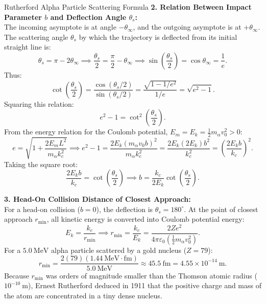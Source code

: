 \begin{workedexample}{Rutherford Alpha Particle Scattering Formula}
\textbf{2. Relation Between Impact Parameter $b$ and Deflection Angle $\theta_s$:}\\
The incoming asymptote is at angle $-\theta_\infty$, and the outgoing asymptote is at $+\theta_\infty$.
The scattering angle $\theta_s$ by which the trajectory is deflected from its initial straight line is:
\[
\theta_s = \pi - 2\theta_\infty \implies \frac{\theta_s}{2} = \frac{\pi}{2} - \theta_\infty \implies \sin\left(\frac{\theta_s}{2}\right) = \cos\theta_\infty = \frac{1}{e}.
\]
Thus:
\[
\cot\left(\frac{\theta_s}{2}\right) = \frac{\cos(\theta_s/2)}{\sin(\theta_s/2)} = \frac{\sqrt{1 - 1/e^2}}{1/e} = \sqrt{e^2 - 1}.
\]
Squaring this relation:
\[
e^2 - 1 = \cot^2\left(\frac{\theta_s}{2}\right).
\]
From the energy relation for the Coulomb potential, $E_m = E_k = \frac{1}{2}m_\alpha v_0^2 > 0$:
\[
e = \sqrt{1 + \frac{2 E_m L^2}{m_\alpha k_c^2}} \implies e^2 - 1 = \frac{2 E_k (m_\alpha v_0 b)^2}{m_\alpha k_c^2} = \frac{2 E_k (2 E_k) b^2}{k_c^2} = \left(\frac{2 E_k b}{k_c}\right)^2.
\]
Taking the square root:
\[
\frac{2 E_k b}{k_c} = \cot\left(\frac{\theta_s}{2}\right) \implies b = \frac{k_c}{2 E_k} \cot\left(\frac{\theta_s}{2}\right).
\]

\textbf{3. Head-On Collision Distance of Closest Approach:}\\
For a head-on collision ($b = 0$), the deflection is $\theta_s = 180^\circ$. At the point of closest approach $r_{\min}$, all kinetic energy is converted into Coulomb potential energy:
\[
E_k = \frac{k_c}{r_{\min}} \implies r_{\min} = \frac{k_c}{E_k} = \frac{2Ze^2}{4\pi\varepsilon_0 \left(\frac{1}{2}m_\alpha v_0^2\right)}.
\]
For a $5.0\ \mathrm{MeV}$ alpha particle scattered by a gold nucleus ($Z = 79$):
\[
r_{\min} = \frac{2(79)(1.44\ \mathrm{MeV\cdot fm})}{5.0\ \mathrm{MeV}} \approx 45.5\ \mathrm{fm} = 4.55\times 10^{-14}\ \mathrm{m}.
\]
Because $r_{\min}$ was orders of magnitude smaller than the Thomson atomic radius ($10^{-10}\ \mathrm{m}$), Ernest Rutherford deduced in 1911 that the positive charge and mass of the atom are concentrated in a tiny dense nucleus.
\end{workedexample}
